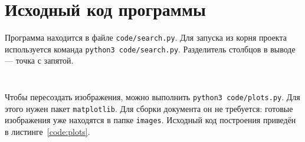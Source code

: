 \section{Исходный код программы}
\label{app:source}
Программа находится в файле \texttt{code/search.py}. Для запуска
из корня проекта используется команда \verb|python3 code/search.py|.
Разделитель столбцов в выводе --- точка с запятой.

\label{code:search}
\inputminted[firstline=1,lastline=24]{python}{code/search.py}

\clearpage
{}
\label{code:experiment}
\inputminted[firstline=27,firstnumber=27]{python}{code/search.py}

Чтобы пересоздать изображения, можно выполнить
\verb|python3 code/plots.py|. Для этого нужен пакет \texttt{matplotlib}.
Для сборки документа он не требуется: готовые изображения уже находятся
в папке \texttt{images}. Исходный код построения приведён
в листинге~\ref{code:plots}.
\clearpage
{}
\label{code:plots}
\inputminted{python}{code/plots.py}
